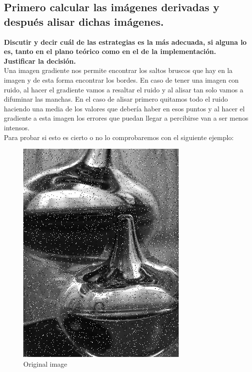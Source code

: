\documentclass{article}
\begin{document}
\subsection{Primero calcular las imágenes derivadas y después alisar dichas imágenes. }


\textbf{Discutir y decir cuál de las estrategias es la más adecuada, si alguna lo
es, tanto en el plano teórico como en el de la implementación. Justificar
la decisión.}\\

Una imagen gradiente nos permite encontrar los saltos bruscos que hay en la imagen y de esta forma encontrar los bordes. En caso de tener una imagen con ruido, al hacer el gradiente vamos a resaltar el ruido y al alisar tan solo vamos a difuminar las manchas. En el caso de alisar primero quitamos todo el ruido haciendo una media de los valores que debería haber en esos puntos y al hacer el gradiente a esta imagen los errores que puedan llegar a percibirse van a ser menos intensos.
\\
Para probar si esto es cierto o no lo comprobaremos con el siguiente ejemplo:

\begin{figure}[h]
\vspace{0.5cm}
\centering
\includegraphics[scale=0.45]{noise.png}
\caption{Original image}	
\end{figure}
\end{document}
